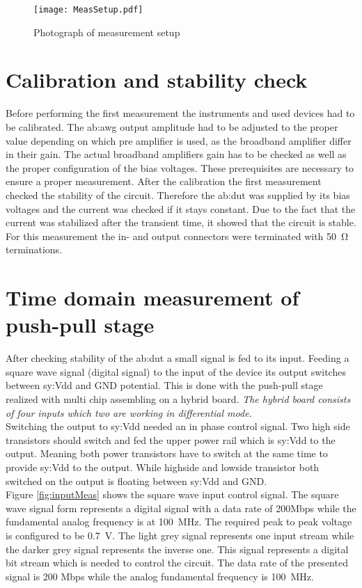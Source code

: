 \begin{figure}[htb!]
	\centering
  \texttt{[image: MeasSetup.pdf]}
	\caption{Photograph of measurement setup}
	\label{fig:PhotoMeasSetup}
\end{figure}

\section{Calibration and stability check}
Before performing the first measurement the instruments and used devices had to be calibrated.
The \gls{ab:awg} output amplitude had to be adjusted to the proper value depending on which pre amplifier is used, as the broadband amplifier differ in their gain.
The actual broadband amplifiers gain has to be checked as well as the proper configuration of the bias voltages.
These prerequisites are necessary to ensure a proper measurement.
After the calibration the first measurement checked the stability of the circuit.
Therefore the \gls{ab:dut} was supplied by its bias voltages and the current was checked if it stays constant.
Due to the fact that the current was stabilized after the transient time, it showed that the circuit is stable.
For this measurement the in- and output connectors were terminated with \SI{50}{\ohm} terminations.


\section{Time domain measurement of push-pull stage}
After checking stability of the \gls{ab:dut} a small signal is fed to its input.
Feeding a square wave signal (digital signal) to the input of the device its output switches between \gls{sy:Vdd} and GND potential.
This is done with the push-pull stage realized with multi chip assembling on a hybrid board.
\textit{The hybrid board consists of four inputs which two are working in differential mode.}\\
Switching the output to \gls{sy:Vdd} needed an in phase control signal.
Two high side transistors should switch and fed the upper power rail which is \gls{sy:Vdd} to the output.
Meaning both power transistors have to switch at the same time to provide \gls{sy:Vdd} to the output.
While highside and lowside transistor both switched on the output is floating between \gls{sy:Vdd} and GND.\\
Figure \ref{fig:inputMeas} shows the square wave input control signal.
The square wave signal form represents a digital signal with a data rate of 200Mbps while the fundamental analog frequency is at \SI{100}{\mega \hertz}.
The required peak to peak voltage is configured to be \SI{0.7}{\volt}.
The light grey signal represents one input stream while the darker grey signal represents the inverse one.
This signal represents a digital bit stream which is needed to control the circuit.
The data rate of the presented signal is 200 Mbps while the analog fundamental frequency is \SI{100}{\mega\hertz}.

